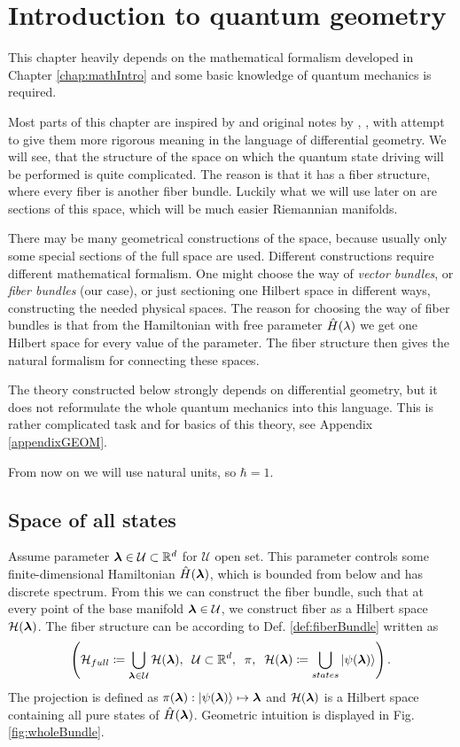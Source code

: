 \chapter{Introduction to quantum geometry}
\label{chap:driving}
This chapter heavily depends on the mathematical formalism developed in Chapter \ref{chap:mathIntro} and some basic knowledge of quantum mechanics is required.

Most parts of this chapter are inspired by \citet{kolodrubez} and original notes by \citet{berry1984}, \citet{berry1989}, \citet{berry2009} with attempt to give them more rigorous meaning in the language of differential geometry. We will see, that the structure of the space on which the quantum state driving will be performed is quite complicated. The reason is that it has a fiber structure, where every fiber is another fiber bundle. Luckily what we will use later on are sections of this space, which will be much easier Riemannian manifolds. 

There may be many geometrical constructions of the space, because usually only some special sections of the full space are used. Different constructions require different mathematical formalism. One might choose the way of \emph{vector bundles}, or \emph{fiber bundles} (our case), or just sectioning one Hilbert space in different ways, constructing the needed physical spaces. The reason for choosing the way of fiber bundles is that from the Hamiltonian with free parameter $\hat{H}(\lambda)$ we get one Hilbert space for every value of the parameter. The fiber structure then gives the natural formalism for connecting these spaces.

The theory constructed below strongly depends on differential geometry, but it does not reformulate the whole quantum mechanics into this language. This is rather complicated task and for basics of this theory, see Appendix \ref{appendixGEOM}.

From now on we will use natural units, so $\hbar=1$.

\section{Space of all states}
Assume parameter ${\bm\lambda}\in\mathcal{U}\subset\mathbb{R}^d$ for $\mathcal U$ open set. This parameter controls some finite-dimensional Hamiltonian $\hat{H}({\bm\lambda})$, which is bounded from below and has discrete spectrum. From this we can construct the fiber bundle, such that at every point of the base manifold ${\bm\lambda}\in \mathcal{U}$, we construct fiber as a Hilbert space $\mathcal{H}({\bm\lambda})$. The fiber structure can be according to Def. \ref{def:fiberBundle} written as
$$\left(\mathcal{H}_{full}\coloneqq \bigcup_{{\bm\lambda}\in\mathcal U} \mathcal{H}({\bm\lambda}),\;\;\mathcal{U}\subset \mathbb{R}^d,\;\;\pi,\;\; \mathcal{H}({\bm\lambda}) \coloneqq \bigcup_{states}\ket{\psi({\bm\lambda})}  \right).$$
The projection is defined as $\pi({\bm\lambda}): \ket{\psi({\bm\lambda})}\mapsto {\bm\lambda}$ and $\mathcal{H}({\bm\lambda})$ is a Hilbert space containing all pure states of $\hat{H}({\bm\lambda})$.  Geometric intuition is displayed in Fig. \ref{fig:wholeBundle}.

